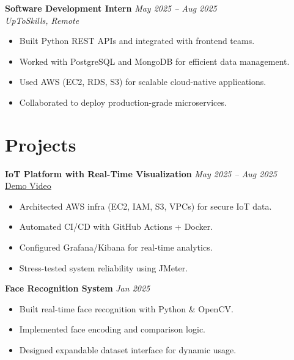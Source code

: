 \documentclass[a4paper,9pt]{article}
\begin{document}
\textbf{Software Development Intern} \hfill \textit{May 2025 -- Aug 2025} \\
\textit{UpToSkills, Remote}
\begin{itemize}
    \item Built Python REST APIs and integrated with frontend teams.
    \item Worked with PostgreSQL and MongoDB for efficient data management.
    \item Used AWS (EC2, RDS, S3) for scalable cloud-native applications.
    \item Collaborated to deploy production-grade microservices.
\end{itemize}

\section*{Projects}

\textbf{IoT Platform with Real-Time Visualization} \hfill \textit{May 2025 -- Aug 2025} \\
\href{https://youtu.be/1zT5QMGNXpc?feature=shared}{\underline{Demo Video}}
\begin{itemize}
    \item Architected AWS infra (EC2, IAM, S3, VPCs) for secure IoT data.
    \item Automated CI/CD with GitHub Actions + Docker.
    \item Configured Grafana/Kibana for real-time analytics.
    \item Stress-tested system reliability using JMeter.
\end{itemize}

\textbf{Face Recognition System} \hfill \textit{Jan 2025} \\
\begin{itemize}
    \item Built real-time face recognition with Python \& OpenCV.
    \item Implemented face encoding and comparison logic.
    \item Designed expandable dataset interface for dynamic usage.
\end{itemize}

\end{document}
